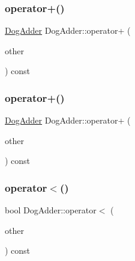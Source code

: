 \mbox{\label{class_dog_adder_ad667166cdafb4352396e910faf09a55f}} 
\subsubsection{\texorpdfstring{operator+()}{operator+()}\hspace{0.1cm}{\footnotesize\ttfamily [2/3]}}
{\footnotesize\ttfamily \mbox{\hyperlink{class_dog_adder}{Dog\+Adder}} Dog\+Adder\+::operator+ (\begin{DoxyParamCaption}\item[{const \mbox{\hyperlink{class_dog_adder}{Dog\+Adder}} \&}]{other }\end{DoxyParamCaption}) const\hspace{0.3cm}{\ttfamily [inline]}}

\mbox{\label{class_dog_adder_ad667166cdafb4352396e910faf09a55f}} 
\subsubsection{\texorpdfstring{operator+()}{operator+()}\hspace{0.1cm}{\footnotesize\ttfamily [3/3]}}
{\footnotesize\ttfamily \mbox{\hyperlink{class_dog_adder}{Dog\+Adder}} Dog\+Adder\+::operator+ (\begin{DoxyParamCaption}\item[{const \mbox{\hyperlink{class_dog_adder}{Dog\+Adder}} \&}]{other }\end{DoxyParamCaption}) const\hspace{0.3cm}{\ttfamily [inline]}}

\mbox{\label{class_dog_adder_a6d87d3ee06c0167e7552ba83daa629e7}} 
\subsubsection{\texorpdfstring{operator$<$()}{operator<()}\hspace{0.1cm}{\footnotesize\ttfamily [1/3]}}
{\footnotesize\ttfamily bool Dog\+Adder\+::operator$<$ (\begin{DoxyParamCaption}\item[{const \mbox{\hyperlink{class_dog_adder}{Dog\+Adder}} \&}]{other }\end{DoxyParamCaption}) const\hspace{0.3cm}{\ttfamily [inline]}}

